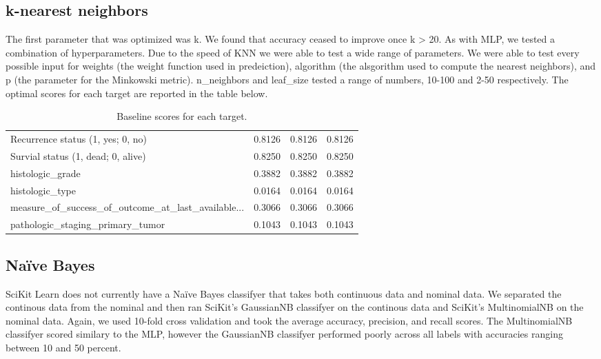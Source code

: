 \documentclass{article}
\begin{document}
\subsection{k-nearest neighbors}
The first parameter that was optimized was k. We found that accuracy ceased to improve once k > 20. 
As with MLP, we tested a combination of hyperparameters. 
Due to the speed of KNN we were able to test a wide range of parameters. We were able to test every possible input for weights (the weight function used in predeiction), algorithm (the alsgorithm used to compute the nearest neighbors), and p (the parameter for the Minkowski metric). 
n_neighbors and leaf_size tested a range of numbers, 10-100 and 2-50 respectively.
The optimal scores for each target are reported in the table below.

\begin{table}[H]
  \begin{center}
  \begin{tabular}{ *{4}{l} }

      Recurrence status (1, yes; 0, no)                  &              0.8126 &               0.8126 &            0.8126 \\
      Survial status (1, dead; 0, alive)                 &              0.8250 &               0.8250 &            0.8250 \\
      histologic\_grade                                   &              0.3882 &               0.3882 &            0.3882 \\
      histologic\_type                                    &              0.0164 &               0.0164 &            0.0164 \\
      measure\_of\_success\_of\_outcome\_at\_last\_available... &              0.3066 &               0.3066 &            0.3066 \\
      pathologic\_staging\_primary\_tumor                   &              0.1043 &               0.1043 &            0.1043 \\


  \end{tabular}
  \caption{Baseline scores for each target.}
  \end{center}
  \end{table}


\subsection{Naïve Bayes}
SciKit Learn does not currently have a Naïve Bayes classifyer that takes both continuous data and nominal data. We separated the continous data from the nominal and then ran SciKit's GaussianNB classifyer on the continous data and SciKit's MultinomialNB on the nominal data. Again, we used 10-fold cross validation and took the average accuracy, precision, and recall scores. The MultinomialNB classifyer scored similary to the MLP, however the GaussianNB classifyer performed poorly across all labels with accuracies ranging between 10 and 50 percent.
\end{document}
